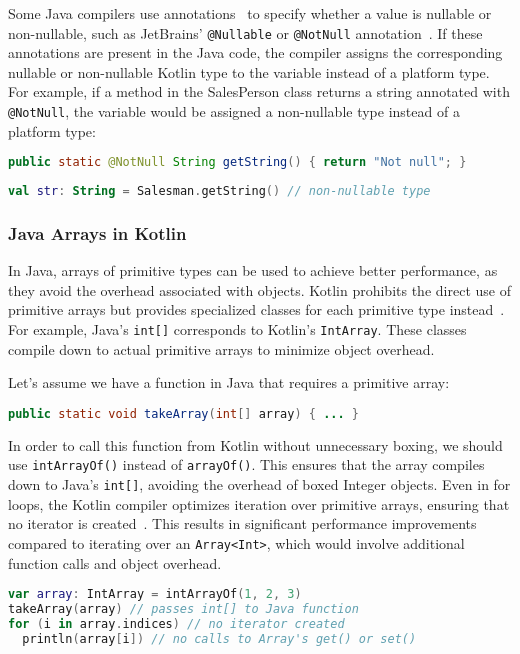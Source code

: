 \documentclass[a4paper,11pt]{article}
\begin{document}
Some Java compilers use annotations~\cite{interop-nullability-annotations} to specify whether a value is nullable or non-nullable, such as JetBrains' \texttt{@Nullable} or \texttt{@NotNull} annotation~\cite{JetBrains-annotations}. If these annotations are present in the Java code, the compiler assigns the corresponding nullable or non-nullable Kotlin type to the variable instead of a platform type. For example, if a method in the SalesPerson class returns a string annotated with \texttt{@NotNull}, the variable would be assigned a non-nullable type instead of a platform type:
\begin{lstlisting}[language=Java]
public static @NotNull String getString() { return "Not null"; }
\end{lstlisting}
\begin{lstlisting}[language=Kotlin]
val str: String = Salesman.getString() // non-nullable type
\end{lstlisting}

\subsubsection{Java Arrays in Kotlin}
In Java, arrays of primitive types can be used to achieve better performance, as they avoid the overhead associated with objects. Kotlin prohibits the direct use of primitive arrays but provides specialized classes for each primitive type instead~\cite{interop-arrays}. For example, Java's \texttt{int[]} corresponds to Kotlin's \texttt{IntArray}. These classes compile down to actual primitive arrays to minimize object overhead.

Let's assume we have a function in Java that requires a primitive array:
\begin{lstlisting}[language=Java]
public static void takeArray(int[] array) { ... }
\end{lstlisting}

In order to call this function from Kotlin without unnecessary boxing, we should use \texttt{intArrayOf()} instead of \texttt{arrayOf()}. This ensures that the array compiles down to Java's \texttt{int[]}, avoiding the overhead of boxed Integer objects. Even in for loops, the Kotlin compiler optimizes iteration over primitive arrays, ensuring that no iterator is created~\cite{interop-arrays}. This results in significant performance improvements compared to iterating over an \texttt{Array<Int>}, which would involve additional function calls and object overhead.

\begin{lstlisting}[language=Kotlin]
var array: IntArray = intArrayOf(1, 2, 3)
takeArray(array) // passes int[] to Java function
for (i in array.indices) // no iterator created
  println(array[i]) // no calls to Array's get() or set()
\end{lstlisting}
\end{document}
